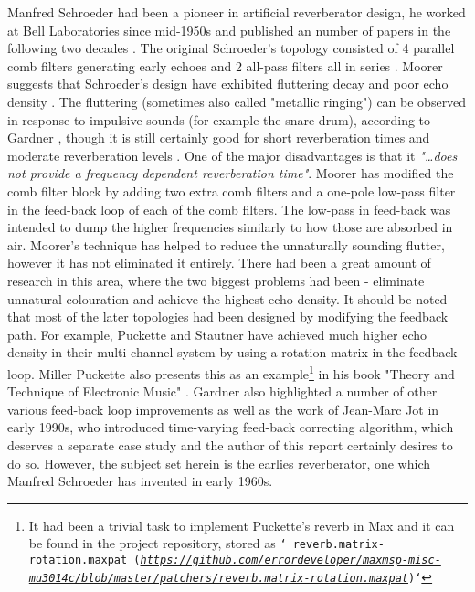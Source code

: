 \documentclass[12pt]{report}
\newcommand{\href}[2]{#2 (\texttt{\emph{\url{#1}}})} %
\begin{document}
  Manfred Schroeder had been a pioneer in artificial reverberator design, he
  worked at Bell Laboratories since mid-1950s and published an number of papers
  in the following two decades \cite{dattorro1997effect}. The original
  Schroeder's topology consisted of 4 parallel comb filters generating early
  echoes and 2 all-pass filters all in series \cite{gardner1992virtual}.
  Moorer suggests that Schroeder's design have exhibited fluttering decay
  and poor echo density \cite{moorer1979about}. The fluttering (sometimes also
  called "metallic ringing") can be observed in response to impulsive sounds
  (for example the snare drum), according to Gardner \cite{gardner1992virtual},
  though it is still certainly good for short reverberation times and moderate
  reverberation levels \cite{gardner1998algorithms}. One of the major disadvantages
  is that it \emph{"\dots does not provide a frequency dependent reverberation time"}.
  Moorer \cite{moorer1979about} has modified the comb filter block by adding
  two extra comb filters and a one-pole low-pass filter in the feed-back loop
  of each of the comb filters. The low-pass in feed-back was intended to
  dump the higher frequencies similarly to how those are absorbed in air.
  Moorer's technique has helped to reduce the unnaturally sounding flutter,
  however it has not eliminated it entirely. There had been a great amount of
  research in this area, where the two biggest problems had been - eliminate
  unnatural colouration and achieve the highest echo density. It should be
  noted that most of the later topologies had been designed by modifying the
  feedback path. For example, Puckette and Stautner \cite{puckette1982reverb}
  have achieved much higher echo density in their multi-channel system by
  using a rotation matrix in the feedback loop. Miller Puckette also presents
  this as an example\footnote{It had been a trivial task to implement Puckette's
  reverb in Max and it can be found in the project repository, stored as \texttt{`%
  \href{https://github.com/errordeveloper/maxmsp-misc-mu3014c/blob/master/patchers/reverb.matrix-rotation.maxpat}{reverb.matrix-rotation.maxpat}`}} in his book "Theory and Technique of Electronic Music"%
  \cite{puckette2007theory}.
  Gardner \cite{gardner1998algorithms} also highlighted a number of other
  various feed-back loop improvements as well as the work of Jean-Marc Jot in
  early 1990s, who introduced time-varying feed-back correcting algorithm,
  which deserves a separate case study and the author of this report certainly
  desires to do so. However, the subject set herein is the earlies reverberator,
  one which Manfred Schroeder has invented in early 1960s.
\end{document}
